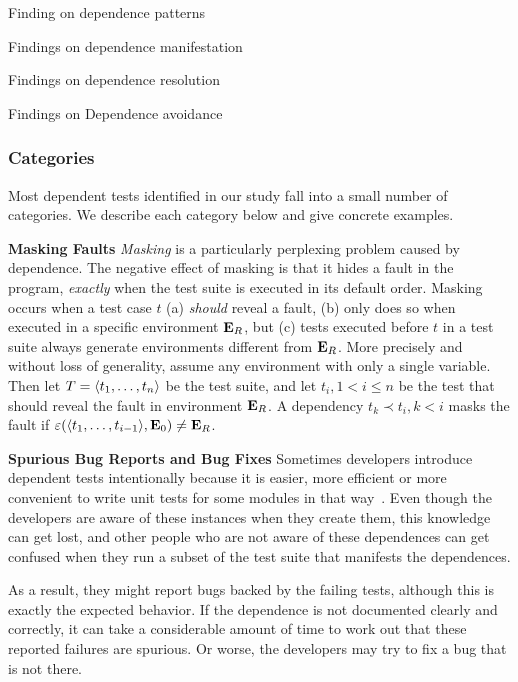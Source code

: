 Finding on dependence patterns

Findings on dependence manifestation

Findings on dependence resolution

Findings on Dependence avoidance



\subsubsection{Categories}

Most dependent tests identified in our study fall into a small
number of categories. We describe each category below and give
concrete examples. 

\vspace{1mm}

\noindent \textbf{Masking Faults}
\emph{Masking} is a particularly perplexing problem caused by
dependence.
The negative effect of masking is that it hides a fault in the
program, \emph{exactly} when the test suite is executed in its default
order. 
Masking occurs when a test case $t$ (a) \emph{should}
reveal a fault, (b) only does so when executed in a specific environment
$\mathbf{E}_R$, but (c) tests executed before $t$ in a test suite always
generate environments different from
$\mathbf{E}_R$.
More precisely and without loss of generality, assume any
environment with only a single variable. Then let $T =
 \langle t_1,\dots,t_n \rangle $ be the test suite, and let $t_i, 1 < i \leq n$
be the test that should reveal the fault in environment $\mathbf{E}_R$. A
dependency $t_k \prec t_i, k < i$ masks the fault if
$\varepsilon( \langle t_1,\dots,t_{i-1} \rangle ,\mathbf{E}_0) \neq \mathbf{E}_R$.

\vspace{1mm}

\noindent \textbf{Spurious Bug Reports and Bug Fixes}
Sometimes developers introduce dependent tests intentionally because it is
easier, more efficient or more convenient to write unit tests for some modules
in that way~\cite{kapfhammeretal:FSE:2003, whittakeretal:2012}.
Even though the developers are aware of these instances
when they create them, this knowledge can get lost, 
and other people who are not aware of these dependences can get confused 
when they run a subset of the test suite that manifests the
dependences.

As a result, they
might report bugs backed by the failing tests, although this is exactly the expected
behavior. If the dependence is not documented clearly and
correctly, it can take a considerable amount of time to work out that
these reported failures are spurious. Or worse, the developers may try
to fix a bug that is not there.


